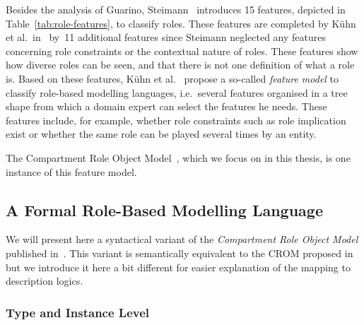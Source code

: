 Besides the analysis of Guarino, Steimann~\cite{Stei-DKE00} introduces 15 features, depicted in
Table~\ref{tab:role-features}, to classify roles. These features are completed by Kühn et al.\
in~\cite{KuLG-SLE14} by~11 additional features since Steimann neglected any features concerning role
constraints or the contextual nature of roles.  These features show how diverse roles can be seen,
and that there is not one definition of what a role is. Based on these features, Kühn et
al.~\cite{KuLG-SLE14} propose a so-called \emph{feature model} to classify role-based modelling
languages, i.e.\ several features organised in a tree shape from which a domain expert can select
the features he needs. These features include, for example, whether role constraints such as role
implication exist or whether the same role can be played several times by an entity.

The Compartment Role Object Model~\cite{KBG-SLE15}, which we focus on in this thesis, is one
instance of this feature model.


\subsection{A Formal Role-Based Modelling Language}
\label{sec:sigma-crom}

We will present here a syntactical variant of the \emph{Compartment Role Object Model}
published in~\cite{KBG-SLE15}. This variant is semantically equivalent to the CROM proposed
in~\cite{KBG-SLE15} but we introduce it here a bit different for easier explanation of the mapping
to description logics.

\subsubsection{Type and Instance Level}
\label{sec:type-instance-level}

